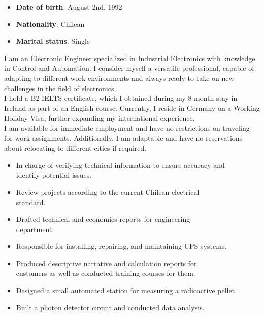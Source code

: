 \documentclass[10pt,letterpaper,ragged2e,withhyper]{altacv}
\begin{document}
\begin{paracol}{2}
\begin{itemize}
    \item \textbf{Date of birth}: August 2nd, 1992 
    \item \textbf{Nationality}: Chilean
    \item \textbf{Marital status}: Single
\end{itemize}

I am an Electronic Engineer specialized in Industrial Electronics with knowledge in Control and Automation. I consider myself a versatile professional, capable of adapting to different work environments and always ready to take on new challenges in the field of electronics.\\

I hold a B2 IELTS certificate, which I obtained during my 8-month stay in Ireland as part of an English course. Currently, I reside in Germany on a Working Holiday Visa, further expanding my international experience.\\ 

I am available for immediate employment and have no restrictions on traveling for work assignments. Additionally, I am adaptable and have no reservations about relocating to different cities if required.

 

\begin{itemize}
\item In charge of verifying technical information to ensure accuracy and \\ identify  potential issues.
\item Review projects according to the current Chilean electrical \\standard.
\item Drafted technical and economics reports for engineering \\ department.
\end{itemize}
\divider
{}
\begin{itemize}
\item Responsible for installing, repairing, and maintaining UPS systems.
\item Produced descriptive narrative and calculation reports for \\ customers as well as conducted training courses for them. 
\end{itemize}
\divider
{}
\begin{itemize}
\item Designed a small automated station for measuring a radioactive pellet.
\item Built a photon detector circuit and conducted data analysis.
\end{itemize}



\end{paracol}
\end{document}
